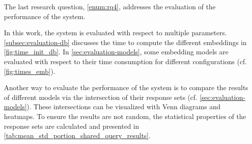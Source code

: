 The last research question, \ref{enum:rq4}, 
addresses the evaluation of the performance of the system.

In this work, the system is evaluated with respect to multiple parameters.
\autoref{subsec:evaluation-db} discusses 
the time to compute the different embeddings in \autoref{fig:time_init_db}.
In \autoref{sec:evaluation-models}, some embedding models are evaluated 
with respect to their time consumption for different configurations (cf. \autoref{fig:times_emb}).

Another way to evaluate the performance of the system is to 
compare the results of different models via the intersection 
of their response sets (cf. \autoref{sec:evaluation-models}).
These intersections can be visualized with Venn diagrams and heatmaps.
To ensure the results are not random, 
the statistical properties of the response sets are calculated 
and presented in \autoref{tab:mean_std_portion_shared_query_results}.